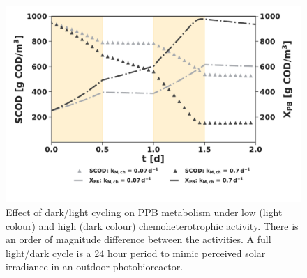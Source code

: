 \begin{figure}[h]
    \centering
    \includegraphics[width=1\linewidth]{./Chap2/simulations/ch2_kmch.pdf}
    \caption{Effect of dark/light cycling on PPB metabolism under low (light colour) and high (dark colour) chemoheterotrophic activity. There is an order of magnitude difference between the activities. A full light/dark cycle is a 24 hour period to mimic perceived solar irradiance in an outdoor photobioreactor.}
    \label{fig:ch2_kmch}
\end{figure}

